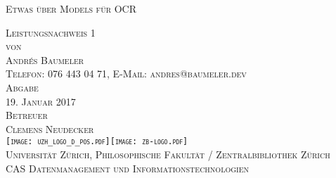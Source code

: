 

\begin{titlepage}

\begin{center}
\Large
\textsc{Etwas über Models für OCR}\\

\vspace{4cm}

\textsc{Leistungsnachweis 1\\[0.5\baselineskip]
 von\\[0.5\baselineskip]
Andrés Baumeler\\
{\normalsize \textsc{Telefon: 076 443 04 71, E-Mail: andres@baumeler.dev }}}\\

\vspace{3cm}
\textsc{Abgabe} \\
\textsc{19. Januar 2017}\\ %

\vspace{1cm}
\textsc{Betreuer\\
Clemens Neudecker}\\

\vspace{2cm}
\textsc{ \texttt{[image: uzh\_logo\_d\_pos.pdf]}\hspace{1cm}\texttt{[image: zb-logo.pdf]} \\
Universität Zürich, Philosophische Fakultät  / Zentralbibliothek Zürich\\
\normalsize{CAS Datenmanagement und Informationstechnologien}}\\

\end{center}

\end{titlepage}
